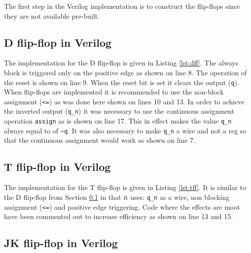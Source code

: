 \documentclass[12pt]{article}
\begin{document}
The first step in the Verilog implementation is to construct the flip-flops
since they are not available pre-built.

\subsection{D flip-flop in Verilog}
\label{sec:dff}

The implementation for the D flip-flop is given in Listing \ref{lst:dff}.
The always block is triggered only on the positive edge as shown
on line 8.
The operation of the reset is shown on line 9.
When the reset bit is set it clears the output (\verb+q+).
When flip-flops are implemented it is recommended to use the non-block
assignment (\verb+<=+) as was done here shown on lines 10 and 13.
In order to achieve the inverted output (\verb+q_n+) it was necessary
to use the continuous assignment operation \verb+assign+ as is shown
on line 17.
This in effect makes the value \verb+q_n+ always equal to
of \verb+~q+.
It was also necessary to make \verb+q_n+ a wire and not a reg so that
the continuous assignment would work as shown on line 7.



\subsection{T flip-flop in Verilog}
\label{sec:tff}

The implementation for the T flip-flop is given in Listing \ref{lst:tff}.
It is similar to the D flip-flop from Section \ref{sec:dff} in that it
uses: \verb+q_n+ as a wire, non blocking assignment (\verb+<=+)
and positive edge triggering.
Code where the effects are moot have been commented out
to increase efficiency as shown on line 13 and 15.



\subsection{JK flip-flop in Verilog}
\end{document}
